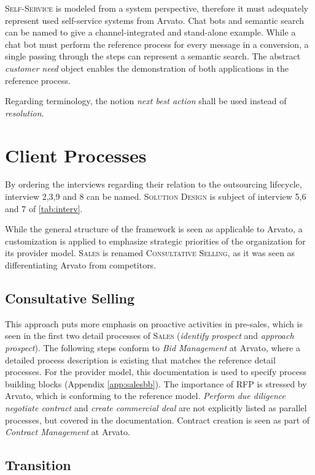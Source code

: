 	\textsc{Self-Service} is modeled from a system perspective, therefore it must adequately represent used self-service systems from Arvato. Chat bots and semantic search can be named to give a channel-integrated and stand-alone example. While a chat bot must perform the reference process for every message in a conversion, a single passing through the steps can represent a semantic search. The abstract \textit{customer need}  object enables the demonstration of both applications in the reference process.   

	Regarding terminology, the notion \textit{next best action} shall be used instead of \textit{resolution}. 
	\section{Client Processes}
	By ordering the interviews regarding their relation to the outsourcing lifecycle, interview 2,3,9 and 8 can be named. \textsc{Solution Design} is subject of interview 5,6 and 7 of \Tab \ref{tab:interv}.
	
	While the general structure of the framework is seen as applicable to Arvato, a customization is applied to emphasize strategic priorities of the organization for its provider model. \textsc{Sales} is renamed \textsc{Consultative Selling}, as it was seen as differentiating Arvato from competitors. 
	
	\subsection{Consultative Selling}
	
	This approach puts more emphasis on proactive activities in pre-sales, which is seen in the first two detail processes of \textsc{Sales} (\textit{identify prospect} and \textit{approach prospect}). The following steps conform to \textit{Bid Management} at Arvato, where a detailed process description is existing that matches the reference detail processes. For the provider model, this documentation is used to specify process building blocks (\cf Appendix \ref{app:salesbb}). 	The importance of \acrshort{RFP} is stressed by Arvato, which is conforming to the reference model. \textit{Perform due diligence} \textit{negotiate contract} and \textit{create commercial deal} are not explicitly listed as parallel processes, but covered in the documentation. Contract creation is seen as part of \textit{Contract Management} at Arvato. 
	
	\subsection{Transition}
	
